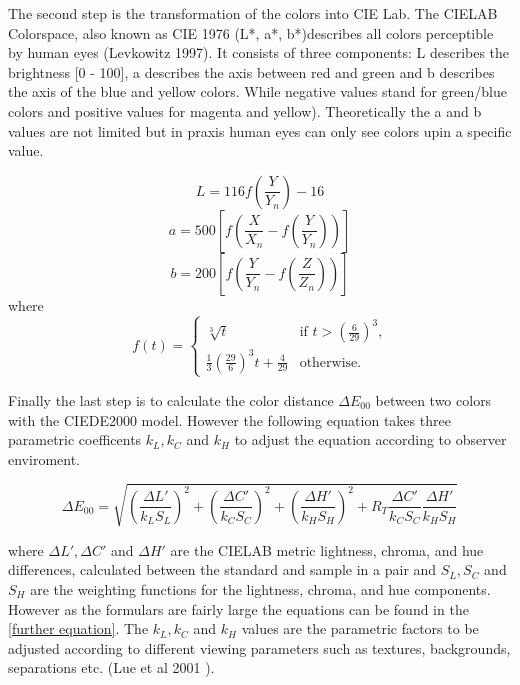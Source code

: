 The second step is the transformation of the colors into CIE Lab. The CIELAB Colorspace, also known as CIE 1976 (L*, a*, b*)describes all colors perceptible by human eyes (Levkowitz 1997). It consists of three components: L describes the brightness [0 - 100], a describes the axis between red and green and b describes the axis of the blue and yellow colors. While negative values stand for green/blue colors and positive values for magenta and yellow). Theoretically the a and b values are not limited but in praxis human eyes can only see colors upin a specific value. 

\begin{equation}
L = 116 f(\frac{Y}{Y_{n}})-16
\end{equation}
\begin{equation}
a = 500 [f(\frac{X}{X_{n}}-f(\frac{Y}{Y_n}))]
\end{equation}
\begin{equation}
b = 200 [f(\frac{Y}{Y_{n}}-f(\frac{Z}{Z_n}))]
\end{equation}
where
\begin{equation}
f(t) =
\begin{cases}
	\sqrt[3]{t} & \text{if $t > (\frac{6}{29})^{3}$,}\\
	\frac{1}{3}(\frac{29}{6})^{3}t+\frac{4}{29} & \text{otherwise.}
\end{cases}
\end{equation}

Finally the last step is to calculate the color distance $\Delta E_{00}$ between two colors with the CIEDE2000 model. However the following equation takes three parametric coefficents $k_{L}, k_{C}$ and $k_{H}$ to adjust the equation according to observer enviroment.

\begin{equation}
\Delta E_{00}= \sqrt{(\frac{\Delta L'}{k_{L}S_{L}})^{2}+(\frac{\Delta C'}{k_{C}S_{C}})^{2}+(\frac{\Delta H'}{k_{H}S_{H}})^{2}+R_{T}\frac{\Delta C'}{k_{C}S_{C}}\frac{\Delta H'}{k_{H}S_{H}}}
\end{equation}

where $\Delta L', \Delta C'$ and $\Delta H'$ are the CIELAB metric lightness, chroma, and hue differences, calculated
between the standard and sample in a pair and $S_{L}, S_{C}$ and $S_{H}$ are the weighting functions for the lightness,
chroma, and hue components. However as the formulars are fairly large the equations can be found in the \ref{further equation}.
The $k_{L}, k_{C}$ and $k_{H}$ values are the parametric factors to be adjusted according to different viewing parameters such as textures, backgrounds, separations etc. (Lue et al 2001 \parencite{brychtova2015}). 
